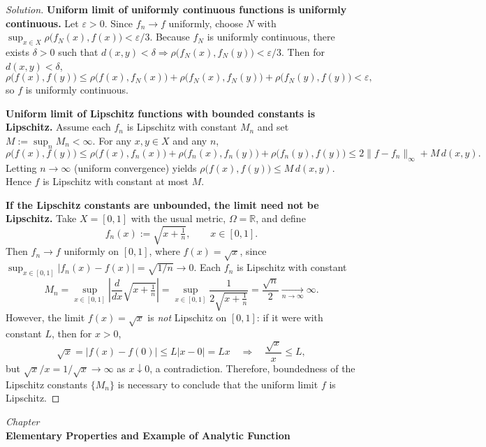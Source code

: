 \documentclass[12pt, a4paper]{report}
\newcommand{\chapter}[1]{%
  \par\vspace{2em}%
  \refstepcounter{section}%
  \begin{center}
    \textit{Chapter \thesection} \\[1.5ex]
    \textbf{#1}
  \end{center}
  \vspace{1em}%
}
\theoremstyle{spaced}
\begin{document}
\begin{proof}[Solution]
	\textbf{Uniform limit of uniformly continuous functions is uniformly continuous.}
	Let $\varepsilon>0$. Since $f_n \to f$ uniformly, choose $N$ with
	$\sup_{x\in X}\rho\!\bigl(f_N(x),f(x)\bigr) < \varepsilon/3$.
	Because $f_N$ is uniformly continuous, there exists $\delta>0$ such that
	$d(x,y)<\delta \Rightarrow \rho\!\bigl(f_N(x),f_N(y)\bigr)<\varepsilon/3$.
	Then for $d(x,y)<\delta$,
	\[
		\rho\!\bigl(f(x),f(y)\bigr)
		\le \rho\!\bigl(f(x),f_N(x)\bigr)+\rho\!\bigl(f_N(x),f_N(y)\bigr)+\rho\!\bigl(f_N(y),f(y)\bigr)
		< \varepsilon,
	\]
	so $f$ is uniformly continuous.

	\medskip
	\textbf{Uniform limit of Lipschitz functions with bounded constants is Lipschitz.}
	Assume each $f_n$ is Lipschitz with constant $M_n$ and set $M:=\sup_n M_n<\infty$.
	For any $x,y\in X$ and any $n$,
	\[
		\rho\!\bigl(f(x),f(y)\bigr)
		\le \rho\!\bigl(f(x),f_n(x)\bigr) + \rho\!\bigl(f_n(x),f_n(y)\bigr) + \rho\!\bigl(f_n(y),f(y)\bigr)
		\le 2\|f-f_n\|_\infty + M\, d(x,y).
	\]
	Letting $n\to\infty$ (uniform convergence) yields $\rho\!\bigl(f(x),f(y)\bigr)\le M\,d(x,y)$.
	Hence $f$ is Lipschitz with constant at most $M$.

	\medskip
	\textbf{If the Lipschitz constants are unbounded, the limit need not be Lipschitz.}
	Take $X=[0,1]$ with the usual metric, $\Omega=\mathbb{R}$, and define
	\[
		f_n(x):=\sqrt{x+\tfrac{1}{n}}, \qquad x\in[0,1].
	\]
	Then $f_n \to f$ uniformly on $[0,1]$, where $f(x)=\sqrt{x}$, since
	$\sup_{x\in[0,1]}|f_n(x)-f(x)| = \sqrt{1/n}\to0$.
	Each $f_n$ is Lipschitz with constant
	\[
		M_n=\sup_{x\in[0,1]} \left|\frac{d}{dx}\sqrt{x+\tfrac{1}{n}}\right|
		= \sup_{x\in[0,1]} \frac{1}{2\sqrt{x+\tfrac{1}{n}}} = \frac{\sqrt{n}}{2}\xrightarrow[n\to\infty]{}\infty.
	\]
	However, the limit $f(x)=\sqrt{x}$ is \emph{not} Lipschitz on $[0,1]$:
	if it were with constant $L$, then for $x>0$,
	\[
		\sqrt{x} = |f(x)-f(0)| \le L |x-0| = Lx \quad\Longrightarrow\quad \frac{\sqrt{x}}{x}\le L,
	\]
	but $\sqrt{x}/x=1/\sqrt{x}\to\infty$ as $x\downarrow0$, a contradiction.
	Therefore, boundedness of the Lipschitz constants $\{M_n\}$ is necessary to conclude
	that the uniform limit $f$ is Lipschitz.
\end{proof}

\newpage

\chapter{Elementary Properties and Example of Analytic Function}
\end{document}
